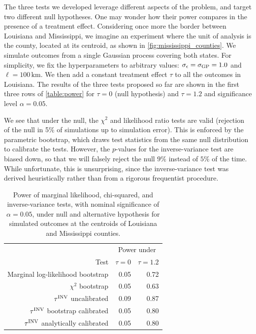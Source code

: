 	The three tests we developed leverage different aspects of the problem, and target two different null hypotheses. One may wonder how their power compares in the presence of a treatment effect. Considering once more the border between Louisiana and Mississippi, we imagine an experiment where the unit of analysis is the county, located at its centroid, as shown in \autoref{fig:mississippi_counties}.
We simulate outcomes from a single Gaussian process covering both states. For simplicity, we fix the hyperparameters to arbitrary values: \(\sigma_{\epsilon}=\sigma_{\mathrm{GP}}=1.0\) and \(\ell=100\,\mathrm{km}\).
We then add a constant treatment effect \(\tau\) to all the outcomes in Louisiana.
The results of the three tests proposed so far are shown in the first three rows of \autoref{table:power} for \(\tau=0\) (null hypothesis) and \(\tau=1.2\) and significance level \(\alpha=0.05\).

	We see that under the null, the \(\chi^2\) and likelihood ratio tests are valid (rejection of the null in 5\% of simulations up to simulation error).
This is enforced by the parametric bootstrap, which draws test statistics from the same null distribution to calibrate the tests.
However, the \(p\)-values for the inverse-variance test are biased down, so that we will falsely reject the null \(9\%\) instead of \(5\%\) of the time.
While unfortunate, this is unsurprising, since the inverse-variance test was derived heuristically rather than from a rigorous frequentist procedure.

\begin{table}
    \centering
    \bgroup
    \def\arraystretch{1.1}%
    \centering
    \begin{tabular}{rrr}
        \hline
        & \multicolumn{2}{c}{Power under} \\
        Test & \(\tau=0\) & \(\tau=1.2\) \\
        \hline
	    Marginal log-likelihood bootstrap & 0.05 & 0.72 \\
	    \(\chi^2\) bootstrap & 0.05 & 0.63 \\
	    \(\tau^{\mathrm{INV}}\) uncalibrated & 0.09 & 0.87 \\
	    \(\tau^{\mathrm{INV}}\) bootstrap calibrated & 0.05 & 0.80 \\
	    \(\tau^{\mathrm{INV}}\) analytically calibrated & 0.05 & 0.80 \\
        \hline
    \end{tabular}
    \egroup
    \caption{
		Power of marginal likelihood, chi-squared, and inverse-variance tests, with nominal significance of \(\alpha=0.05\), under null and alternative hypothesis for simulated outcomes at the centroids of Louisiana and Mississippi counties.
    	\label{table:power}
	}
\end{table}

